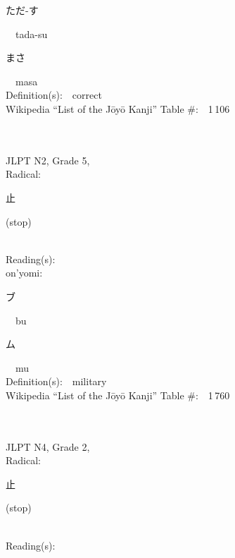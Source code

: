 \begin{multicols}{2}
{\hspace*{2em}}{\begin{CJK}{UTF8}{min} ただ-す \end{CJK}}\ \ tada-su\ \ \\
{\hspace*{2em}}{\begin{CJK}{UTF8}{min} まさ \end{CJK}}\ \ masa\ \ \\
Definition(s):\ \ correct \\
Wikipedia ``List of the J\=oy\=o Kanji'' Table \#:\ \ 1\,106 \\
\ \ \\
{\fontsize{34pt}{40pt}  }\ \ \\  %
{JLPT N2, Grade 5, \\Radical:\ \ {\begin{CJK}{UTF8}{min} 止 \end{CJK}} (stop) } \\
Reading(s):\ \ \\
{\hspace*{1em}}on'yomi:\ \ \\
{\hspace*{2em}}{\begin{CJK}{UTF8}{min} ブ \end{CJK}}\ \ bu\ \ \\
{\hspace*{2em}}{\begin{CJK}{UTF8}{min} ム \end{CJK}}\ \ mu\ \ \\
Definition(s):\ \ military \\
Wikipedia ``List of the J\=oy\=o Kanji'' Table \#:\ \ 1\,760 \\
\ \ \\
{\fontsize{34pt}{40pt}  }\ \ \\  %
{JLPT N4, Grade 2, \\Radical:\ \ {\begin{CJK}{UTF8}{min} 止 \end{CJK}} (stop) } \\
Reading(s):\ \ \\

\end{multicols}
